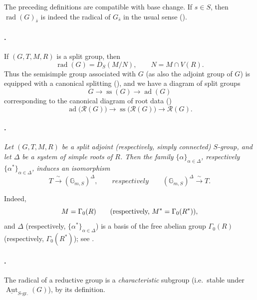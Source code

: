The preceding definitions are compatible with base change. If
\(s\in S\), then
\(\operatorname{rad}(G)_{\bar s}\) is indeed the radical of
\(G_{\bar s}\) in the usual sense \textup{()}.

\paragraph{.}
If \((G,T,M,R)\) is a split group, then
\[
  \operatorname{rad}(G)=D_S(M/N),
  \qquad
  N=M\cap V(R).
\]
Thus the semisimple group associated with \(G\)
\textup{(as also the adjoint group of \(G\))} is equipped with a
canonical splitting \textup{()}, and we have a diagram of
split groups
\[
  G\longrightarrow \operatorname{ss}(G)
   \longrightarrow \operatorname{ad}(G)
\]
corresponding to the canonical diagram of root data
\textup{()}
\[
  \operatorname{ad}\bigl(\mathscr R(G)\bigr)
  \longrightarrow
  \operatorname{ss}\bigl(\mathscr R(G)\bigr)
  \longrightarrow
  \mathscr R(G).
\]

\paragraph{.}
\textit{Let \((G,T,M,R)\) be a split adjoint
\textup{(respectively, simply connected)} \(S\)-group, and let
\(\Delta\) be a system of simple roots of \(R\). Then the family
\(\{\alpha\}_{\alpha\in\Delta}\), respectively
\(\{\alpha^*\}_{\alpha\in\Delta}\), induces an isomorphism}
\[
  T\xrightarrow{\ \sim\ }(\mathbb G_{m,S})^\Delta,
  \qquad\textit{respectively}\qquad
  (\mathbb G_{m,S})^\Delta\xrightarrow{\ \sim\ }T.
\]

Indeed,
\[
  M=\Gamma_0(R)
  \qquad
  \textup{(respectively, \(M^*=\Gamma_0(R^*)\))},
\]
and \(\Delta\) \textup{(respectively,
\(\{\alpha^*\}_{\alpha\in\Delta}\))} is a basis of the free
abelian group \(\Gamma_0(R)\)
\textup{(respectively, \(\Gamma_0(R^*)\))}; see .

\paragraph{.}
The radical of a reductive group is a \emph{characteristic}
subgroup \textup{(i.e.\ stable under
\(\underline{\operatorname{Aut}}_{S\text{-gr.}}(G)\))}, by its
definition.

